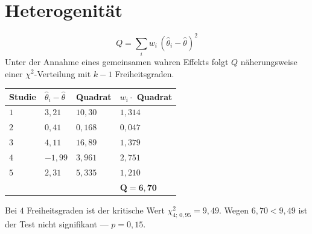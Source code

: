 \section{Heterogenität}

\begin{merksatz}
\[ Q = \sum_i w_i\,(\hat\theta_i - \hat\theta)^2 \]
Unter der Annahme eines gemeinsamen wahren Effekts folgt $Q$ näherungsweise einer $\chi^2$-Verteilung mit $k-1$ Freiheitsgraden.

\begin{center}
{\small
\renewcommand{\arraystretch}{1.38}
\begin{tabular}{@{}P{1.4cm}P{1.8cm}P{1.8cm}P{1.8cm}@{}}
\toprule
\textbf{Studie} & $\hat\theta_i - \hat\theta$ & \textbf{Quadrat} & $w_i \cdot$ Quadrat\\
\midrule
$1$ & $3{,}21$ & $10{,}30$ & $1{,}314$\\
$2$ & $0{,}41$ & $0{,}168$ & $0{,}047$\\
$3$ & $4{,}11$ & $16{,}89$ & $1{,}379$\\
$4$ & $-1{,}99$ & $3{,}961$ & $2{,}751$\\
$5$ & $2{,}31$ & $5{,}335$ & $1{,}210$\\
\midrule
& & & $\mathbf{Q = 6{,}70}$\\
\bottomrule
\end{tabular}}
\end{center}

Bei $4$ Freiheitsgraden ist der kritische Wert $\chi^2_{4;\,0{,}95} = 9{,}49$. Wegen $6{,}70 < 9{,}49$ ist der Test nicht signifikant --- $p = 0{,}15$.
\end{merksatz}

